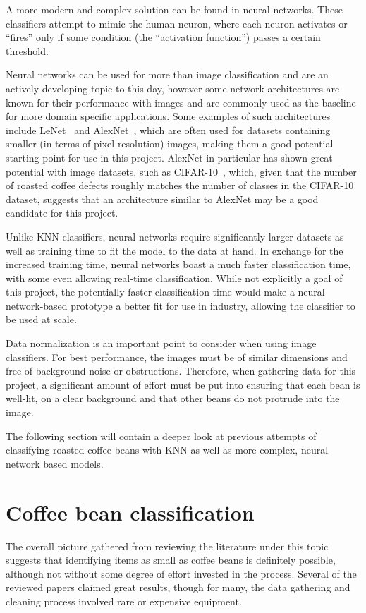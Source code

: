 A more modern and complex solution can be found in neural networks.
These classifiers attempt to mimic the human neuron, where each neuron activates or ``fires'' only if some condition
(the ``activation function'') passes a certain threshold.

Neural networks can be used for more than image classification and are an actively developing topic to this day, however
some network architectures are known for their performance with images and are commonly used as the baseline for more domain
specific applications.
Some examples of such architectures include LeNet~\cite{leNetOverview} and AlexNet~\cite{alexNetOverview}, which are often
used for datasets containing smaller (in terms of pixel resolution) images, making them a good potential starting point
for use in this project.
AlexNet in particular has shown great potential with image datasets, such as CIFAR-10~\cite{cifar10}, which, given that
the number of roasted coffee defects roughly matches the number of classes in the CIFAR-10 dataset, suggests that an architecture
similar to AlexNet may be a good candidate for this project.

Unlike KNN classifiers, neural networks require significantly larger datasets as well as training time to fit the model
to the data at hand.
In exchange for the increased training time, neural networks boast a much faster classification time, with some even allowing
real-time classification.
While not explicitly a goal of this project, the potentially faster classification time would make a neural network-based
prototype a better fit for use in industry, allowing the classifier to be used at scale.

Data normalization is an important point to consider when using image classifiers.
For best performance, the images must be of similar dimensions and free of background noise or obstructions.
Therefore, when gathering data for this project, a significant amount of effort must be put into ensuring that each bean
is well-lit, on a clear background and that other beans do not protrude into the image.

The following section will contain a deeper look at previous attempts of classifying roasted coffee beans with KNN
as well as more complex, neural network based models.

\section{Coffee bean classification}
\label{sec:lit-review-coffee}
The overall picture gathered from reviewing the literature under this topic suggests that identifying
items as small as coffee beans is definitely possible, although not without some degree of effort invested in the process.
Several of the reviewed papers claimed great results, though for many, the data gathering and cleaning process involved
rare or expensive equipment.

